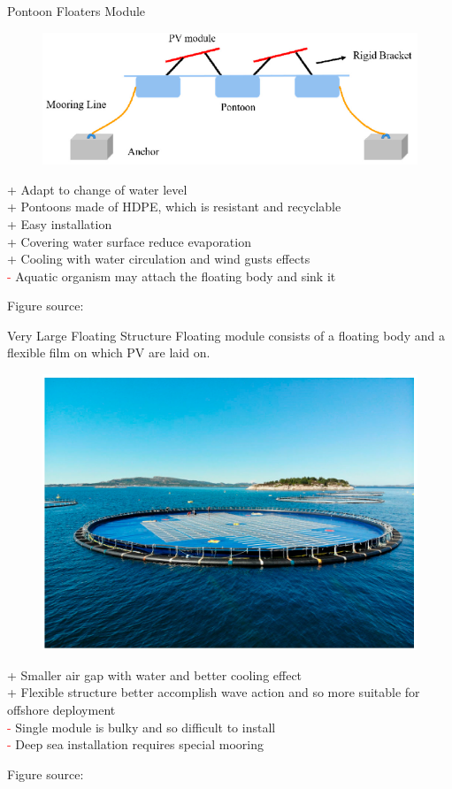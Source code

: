 \documentclass[aspectratio=169, 12pt]{beamer}
\begin{document}
\begin{frame}{Pontoon Floaters Module}
  \begin{figure}
    \centering
    \includegraphics[width=0.3\columnwidth]{figure/pontoon.png}
  \end{figure}
  \textcolor{NTNUgreen}{+} Adapt to change of water level\\
  \textcolor{NTNUgreen}{+} Pontoons made of HDPE, which is resistant and recyclable\\
  \textcolor{NTNUgreen}{+} Easy installation\\
  \textcolor{NTNUgreen}{+} Covering water surface reduce evaporation\\
  \textcolor{NTNUgreen}{+} Cooling with water circulation and wind gusts effects\\
  \textcolor{red}{-} Aquatic organism may attach the floating body and sink it

  {\tiny Figure source: \cite{jmse11112064}}
\end{frame}

\begin{frame}{Very Large Floating Structure}
  Floating module consists of a floating body and a flexible film on which PV are laid on.
  \begin{figure}
    \centering
    \includegraphics[width=0.3\columnwidth]{figure/vlfs.png}
  \end{figure}

  \textcolor{NTNUgreen}{+} Smaller air gap with water and better cooling effect\\
  \textcolor{NTNUgreen}{+} Flexible structure better accomplish wave action and so more suitable for offshore deployment\\
  \textcolor{red}{-} Single module is bulky and so difficult to install\\
  \textcolor{red}{-} Deep sea installation requires special mooring

  {\tiny Figure source: \cite{jmse11112064}}
\end{frame}
\end{document}
